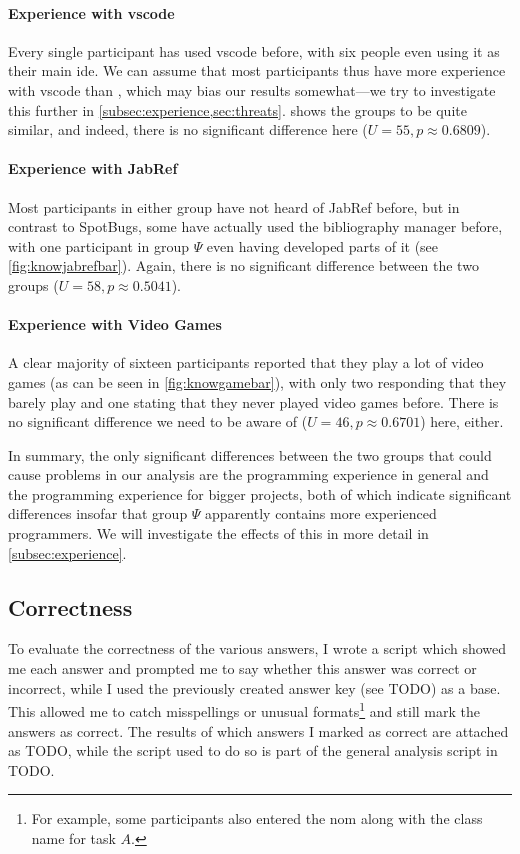 \documentclass[../thesis]{subfiles}
\begin{document}
\paragraph{Experience with \gls{vscode}}
Every single participant has used \gls{vscode} before, with six people even using it as their main \gls{ide}.
We can assume that most participants thus have more experience with \gls{vscode} than \SEE{}, which may bias our results somewhat---we try to investigate this further in \cref{subsec:experience,sec:threats}.
 shows the groups to be quite similar, and indeed, there is no significant difference here ($U = 55, p \approx 0.6809$).

\paragraph{Experience with JabRef}
Most participants in either group have not heard of JabRef before, but in contrast to SpotBugs, some have actually used the bibliography manager before, with one participant in group $\Psi$ even having developed parts of it (see \cref{fig:knowjabrefbar}).
Again, there is no significant difference between the two groups ($U = 58, p \approx 0.5041$).

\paragraph{Experience with Video Games}
A clear majority of sixteen participants reported that they play a lot of video games (as can be seen in \cref{fig:knowgamebar}), with only two responding that they barely play and one stating that they never played video games before.
There is no significant difference we need to be aware of ($U = 46, p \approx 0.6701$) here, either.

In summary, the only significant differences between the two groups that could cause problems in our analysis are the programming experience in general and the programming experience for bigger projects, both of which indicate significant differences insofar that group $\Psi$ apparently contains more experienced programmers.
We will investigate the effects of this in more detail in \cref{subsec:experience}.

\subsection{Correctness}\label{subsec:correct}
To evaluate the correctness of the various answers, I wrote a script which showed me each answer and prompted me to say whether this answer was correct or incorrect, while I used the previously created answer key (see {TODO}) as a base.
This allowed me to catch misspellings or unusual formats\footnote{For example, some participants also entered the \gls{nom} along with the class name for task $A$.} and still mark the answers as correct.
The results of which answers I marked as correct are attached as {TODO}, while the script used to do so is part of the general analysis script in {TODO}.
\end{document}

